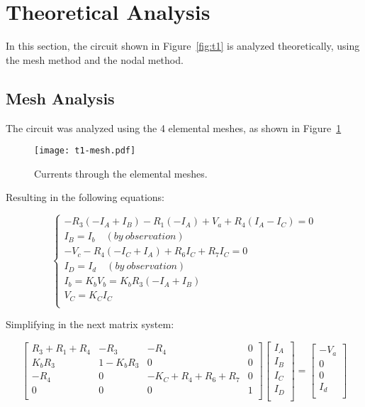 \section{Theoretical Analysis}
\label{sec:analysis}

In this section, the circuit shown in Figure~\ref{fig:t1} is analyzed
theoretically, using the mesh method and the nodal method.

\subsection{Mesh Analysis}
The circuit was analyzed using the 4 elemental meshes, as shown in Figure~\ref{fig:mesh}

\begin{figure}[ht!]
  \centering
  \texttt{[image: t1-mesh.pdf]}
  \caption{Currents through the elemental meshes.}
  \label{fig:mesh}
\end{figure}

Resulting in the following equations:

\begin{equation}\label{meshEq}
  \begin{cases}
    -R_3(-I_A + I_B) - R_1(-I_A) + V_a + R_4(I_A-I_C) = 0 \\
    I_B = I_b\quad (by\ observation) \\
    -V_c - R_4(-I_C + I_A) + R_6I_C+ R_7I_C = 0 \\
    I_D = I_d\quad (by\ observation) \\
    I_b = K_bV_b = K_bR_3(-I_A + I_B) \\
    V_C = K_CI_C \\
  \end{cases}
\end{equation}

Simplifying in the next matrix system:

\begin{equation}\label{meshM}
  \begin{bmatrix}
    R_3+R_1+R_4 & -R_3 & -R_4 & 0 \\
    K_bR_3 & 1-K_bR_3 & 0 & 0 \\
    -R_4 & 0 & -K_C + R_4+R_6+R_7 & 0 \\
    0 & 0 & 0 & 1\\
  \end{bmatrix}
  \begin{bmatrix}
    I_A\\
    I_B\\
    I_C\\
    I_D\\
  \end{bmatrix}
  =
  \begin{bmatrix}
    -V_a\\
    0\\
    0\\
    I_d\\
  \end{bmatrix}
\end{equation}

